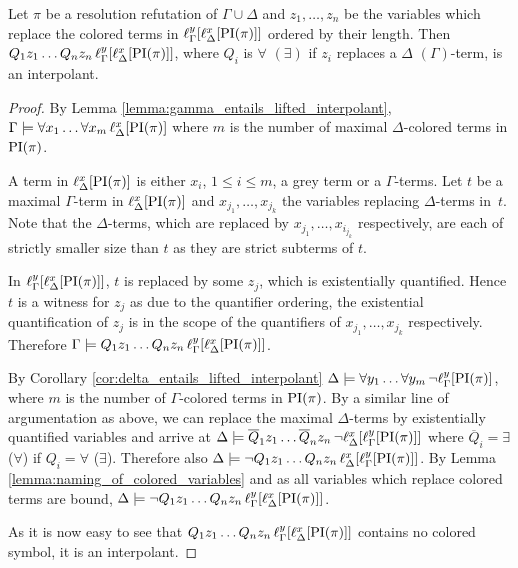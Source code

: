 \begin{thm}
	Let $\pi$ be a resolution refutation of $\Gamma \cup \Delta$ and
	$z_1, \dots, z_n$ be the variables which replace the colored terms in $\lifgamma{\lifdelta{\PI(\pi)}}$ ordered by their length.
	Then
	$Q_1 z_1 \ldots Q_n z_n\,\lifgamma{\lifdelta{\PI(\pi)}}$, where $Q_i$ is $\forall$ $(\exists)$ if $z_i$ replaces a $\Delta$ $(\Gamma)$-term, is an interpolant.
\end{thm}
\begin{proof}
	By Lemma \ref{lemma:gamma_entails_lifted_interpolant}, $\Gamma \entails \forall x_1 \ldots \forall x_m\,\lifdelta{\PI(\pi)}$ where $m$ is the number of maximal $\Delta$-colored terms in $\PI(\pi)$.

	A term in $\lifdelta{\PI(\pi)}$ is either $x_i$, $1 \leq i \leq m$, a grey term or a $\Gamma$-terms.
	Let $t$ be a maximal $\Gamma$-term in $\lifdelta{\PI(\pi)}$ and $x_{j_1}, \dots, x_{j_k}$ the variables replacing $\Delta$-terms in~$t$.
	Note that the $\Delta$-terms, which are replaced by $x_{j_1}, \ldots, x_{i_{j_k}}$ respectively, are each of strictly smaller size than $t$ as they are strict subterms of $t$.


	In $\lifgamma{\lifdelta{\PI(\pi)}}$, $t$ is replaced by some $z_j$, which is existentially quantified.
	Hence $t$ is a witness for $z_j$ as due to the quantifier ordering,
	the existential quantification of $z_j$ is in the scope of the quantifiers of $x_{j_1}, \ldots, x_{j_k}$ respectively.
	Therefore $\Gamma \entails Q_1 z_1 \ldots Q_n z_n\,\lifgamma{\lifdelta{\PI(\pi)}}$.

	By Corollary \ref{cor:delta_entails_lifted_interpolant} $\Delta \entails \forall y_1 \dots \forall y_m\,\lnot \lift{\Gamma}{\PI(\pi)}{y}$, where $m$ is the number of $\Gamma$-colored terms in $\PI(\pi)$.
	By a similar line of argumentation as above, we can replace the maximal $\Delta$-terms by existentially quantified variables and arrive at
	$\Delta \entails\nolinebreak{} \overline Q_1 z_1 \dots \overline Q_n z_n\,\lnot \lft{\Delta}{x}{\lft{\Gamma}{y}{\PI(\pi)}}$ where $\overline Q_i = \exists$ ($\forall$) if $Q_i = \forall$ ($\exists$).
	Therefore also
	$\Delta \entails\nolinebreak{} \lnot Q_1 z_1 \dots Q_n z_n\,\lft{\Delta}{x}{\lft{\Gamma}{y}{\PI(\pi)}}$.
	By Lemma \ref{lemma:naming_of_colored_variables} and as all variables which replace colored terms are bound, 
	$\Delta \entails\nolinebreak{} \lnot Q_1 z_1 \dots Q_n z_n\,\lft{\Gamma}{y}{\lft{\Delta}{x}{\PI(\pi)}}$.

	As it is now easy to see that $Q_1 z_1 \dots Q_n z_n\,\lft{\Gamma}{y}{\lft{\Delta}{x}{\PI(\pi)}}$ contains no colored symbol, it is an interpolant.
\end{proof}



